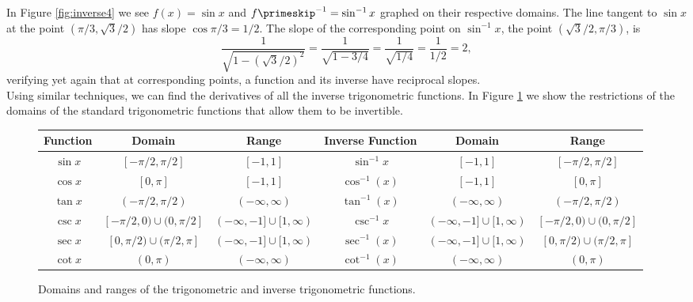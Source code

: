 

In Figure \ref{fig:inverse4} we see $f(x) = \sin x$ and $f\primeskip^{-1} = \sin^{-1} x$ graphed on their respective domains. The line tangent to $\sin x$ at the point $(\pi/3, \sqrt{3}/2)$ has slope $\cos \pi/3 = 1/2$. The slope of the corresponding point on $\sin^{-1}x$, the point $(\sqrt{3}/2,\pi/3)$, is $$\frac{1}{\sqrt{1-(\sqrt{3}/2)^2}} = \frac{1}{\sqrt{1-3/4}} = \frac{1}{\sqrt{1/4}} = \frac{1}{1/2}=2,$$ verifying yet again that at corresponding points, a function and its inverse have reciprocal slopes.\\

Using similar techniques, we can find the derivatives of all the inverse trigonometric functions. In Figure \ref{fig:domain_trig} we show the restrictions of the domains of the standard trigonometric functions that allow them to be invertible.\\

\noindent\hskip-120pt%
\begin{figure}[!ht]
\small\noindent
\begin{tabular}{cccccc}
Function & Domain & Range &\parbox[b]{40pt}{\centering Inverse Function} & Domain & Range\\ \hline
\rule{0pt}{12pt} $\sin x$ & $[-\pi/2, \pi/2]$ & $[-1,1]$&$\sin^{-1} x$ & $[-1,1]$ & $[-\pi/2, \pi/2]$ \\
\rule{0pt}{12pt}$\cos x$ & $[0,\pi]$ & $[-1,1]$&$\cos^{-1}(x)$ & $[-1,1]$ & $[0,\pi]$ \\
\rule{0pt}{12pt}$\tan x$ & $(-\pi/2,\pi/2)$ & $(-\infty,\infty)$&$\tan^{-1}(x)$ & $(-\infty,\infty)$ & $(-\pi/2,\pi/2)$	\\
\rule{0pt}{12pt} $\csc x$ & $[-\pi/2,0)\cup (0, \pi/2]$ & $(-\infty,-1]\cup [1,\infty)$&$\csc^{-1} x$ & $(-\infty,-1]\cup [1,\infty)$ & $[-\pi/2,0)\cup (0, \pi/2]$  \\
\rule{0pt}{12pt}$\sec x$ & $[0,\pi/2)\cup (\pi/2,\pi]$ & $(-\infty,-1]\cup [1,\infty)$&$\sec^{-1}(x)$ & $(-\infty,-1]\cup [1,\infty)$ & $[0,\pi/2)\cup (\pi/2,\pi]$ \\
\rule{0pt}{12pt}$\cot x$ & $(0,\pi)$ & $(-\infty,\infty)$&$\cot^{-1}(x)$ &  $ (-\infty,\infty)$ & $(0,\pi)$	
\end{tabular}
\captionsetup{type=figure}
\caption{Domains and ranges of the trigonometric and inverse trigonometric functions.}\label{fig:domain_trig}
\end{figure}%

